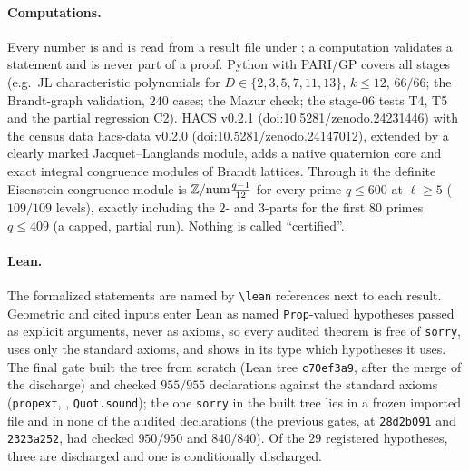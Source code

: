 \paragraph{Computations.} Every number is \stcomp{} and is read from a result file under ; a computation
validates a statement and is never part of a proof. Python with PARI/GP covers all stages (e.g.\ JL characteristic polynomials
for $D\in\{2,3,5,7,11,13\}$, $k\le12$, $66/66$; the Brandt-graph validation, $240$ cases; the Mazur check; the stage-06 tests T4,
T5 and the partial regression C2). HACS v0.2.1 (doi:10.5281/zenodo.24231446) with the census data hacs-data v0.2.0
(doi:10.5281/zenodo.24147012), extended by a clearly marked Jacquet--Langlands module, adds a native quaternion core and exact
integral congruence modules of Brandt lattices. Through it the definite Eisenstein congruence module is
$\mathbb{Z}/\mathrm{num}\frac{q-1}{12}$ for every prime $q\le600$ at $\ell\ge5$ ($109/109$ levels), exactly including the $2$- and $3$-parts
for the first $80$ primes $q\le409$ (a capped, partial run). Nothing is called ``certified''.

\paragraph{Lean.} The formalized statements are named by \texttt{\textbackslash lean} references next to each result. Geometric
and cited inputs enter Lean as named \texttt{Prop}-valued hypotheses passed as explicit arguments, never as axioms, so every
audited theorem is free of \texttt{sorry}, uses only the standard axioms, and shows in its type which hypotheses it uses. The final gate
built the tree from scratch (Lean tree \texttt{c70ef3a9}, after the merge of the  discharge) and checked $955/955$ declarations
against the standard axioms
(\texttt{propext}, , \texttt{Quot.sound}); the one \texttt{sorry} in the built tree lies in a frozen
imported file and in none of the audited declarations (the previous gates, at \texttt{28d2b091} and \texttt{2323a252}, had checked $950/950$ and $840/840$). Of the $29$ registered hypotheses, three are discharged and one
is conditionally discharged.
